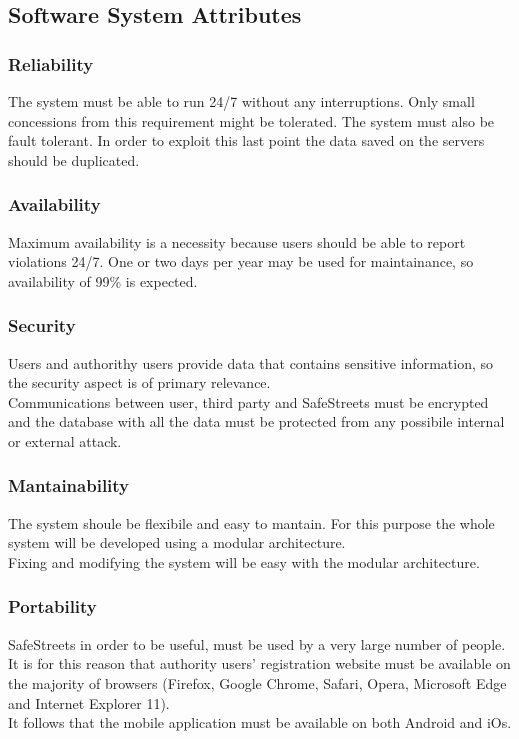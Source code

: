 \documentclass{article}
\begin{document}
\subsection{Software System Attributes}
\subsubsection{Reliability}
The system must be able to run 24/7 without any interruptions. Only small
concessions from this requirement might be tolerated. The system must also be
fault tolerant. In order to exploit this last point the data saved on the
servers should be duplicated.
\subsubsection{Availability}
Maximum availability is a necessity because users should be able to report
violations 24/7. One or two days per year may be used for maintainance, so
availability of 99\% is expected.
\subsubsection{Security}
Users and authorithy users provide data that contains sensitive information, so
the security aspect is of primary relevance.\\ Communications between user,
third party and SafeStreets must be encrypted and the database with all the data
must be protected from any possibile internal or external attack.
\subsubsection{Mantainability}
The system shoule be flexibile and easy to mantain. For this purpose the whole
system will be developed using a modular architecture. \\
Fixing and modifying the system will be easy with the modular architecture.

\subsubsection{Portability}
SafeStreets in order to be useful, must be used by a very large number of people.
It is for this reason that authority users' registration website must be available
on the majority of browsers (Firefox, Google Chrome, Safari, Opera, Microsoft
Edge and Internet Explorer 11).\\
It follows that the mobile application must be available on both Android and iOs.
\end{document}

